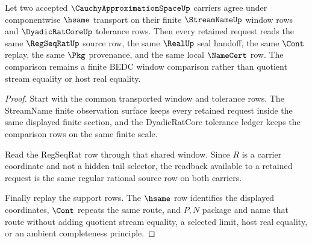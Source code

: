 \begin{theorem}
\label{thm:cauchy-approximation-space-window-stability}
Let two accepted $\CauchyApproximationSpaceUp$ carriers agree under componentwise $\hsame$ transport on their finite $\StreamNameUp$ window rows and $\DyadicRatCoreUp$ tolerance rows. Then every retained request reads the same $\RegSeqRatUp$ source row, the same $\RealUp$ seal handoff, the same $\Cont$ replay, the same $\Pkg$ provenance, and the same local $\NameCert$ row. The comparison remains a finite BEDC window comparison rather than quotient stream equality or host real equality.
\end{theorem}
\begin{proof}
Start with the common transported window and tolerance rows. The StreamName finite observation surface keeps every retained request inside the same displayed finite section, and the DyadicRatCore tolerance ledger keeps the comparison rows on the same finite scale.

Read the RegSeqRat row through that shared window. Since $R$ is a carrier coordinate and not a hidden tail selector, the readback available to a retained request is the same regular rational source row on both carriers.

Finally replay the support rows. The $\hsame$ row identifies the displayed coordinates, $\Cont$ repeats the same route, and $P,N$ package and name that route without adding quotient stream equality, a selected limit, host real equality, or an ambient completeness principle.
\end{proof}

